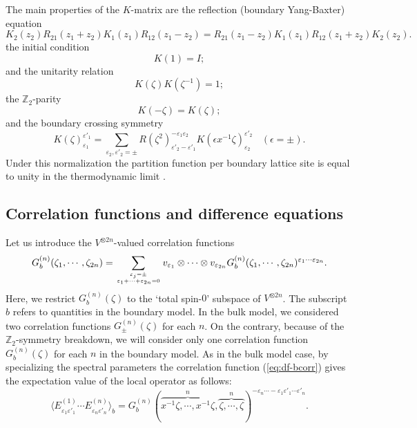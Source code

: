 \documentclass[a4paper,10pt]{article}
\begin{document}
{The main properties of the $K$-matrix 
are the reflection (boundary Yang-Baxter) equation
\begin{equation}
K_2 (z_2 )R_{21}(z_1 +z_2 )K_1 (z_1 )R_{12}(z_1 -z_2 )
=
R_{21}(z_1 -z_2 )K_1 (z_1 )R_{12}(z_1 +z_2 )K_2 (z_2 ). 
\label{eq:RE}
\end{equation}
the initial condition 
\begin{equation}
K(1)=I; 
\label{eq:b-ini}
\end{equation}
and the unitarity relation
\begin{equation}
K(\zeta)K(\zeta^{-1})=1; 
\label{eq:b-uni}
\end{equation}
the $\mathbb{Z}_2$-parity 
\begin{equation}
K(-\zeta)=K(\zeta); 
\label{eq:KZ_2}
\end{equation}
and the boundary crossing symmetry
\begin{equation}
K(\zeta)^{\varepsilon'_1}_{\varepsilon_1}
=\sum_{\varepsilon_2 , \varepsilon'_2 =\pm} 
    R(\zeta^2)_{\varepsilon'_2 -\varepsilon'_1}^{
    -\varepsilon_1 \varepsilon_2} 
    K(\epsilon x^{-1}\zeta )^{
    \varepsilon'_2}_{\varepsilon_2} 
    ~~~~ (\epsilon =\pm ). 
\label{eq:b-cross}
\end{equation}
Under this normalization the partition function per 
boundary lattice site is equal to unity in the 
thermodynamic limit \cite{JKKKM}. 

\subsection{Correlation functions and difference equations}

Let us introduce the $V^{\otimes 2n}$-valued 
correlation functions 
\begin{equation}
G^{(n)}_b (\zeta_1,\cdots,\zeta_{2n})=
\sum_{\varepsilon_j =\pm\atop \varepsilon_1 +
\cdots +\varepsilon_{2n}=0} v_{\varepsilon_1} \otimes 
\cdots \otimes v_{\varepsilon_{2n}} 
G^{(n)}_b (\zeta_1,\cdots,\zeta_{2n})
^{\varepsilon_1 \cdots \varepsilon_{2n}}. 
\label{eq:df-bcorr}
\end{equation}
Here, we restrict $G^{(n)}_b (\zeta)$ 
to the `total spin-$0$' subspace of $V^{\otimes 2n}$. 
The subscript $b$ refers to quantities in the boundary 
model. In the bulk model, we considered two correlation 
functions $G^{(n)}_\pm (\zeta)$ for each $n$. On the contrary, 
because of the  $\mathbb{Z}_2$-symmetry breakdown, 
we will consider only one correlation function 
$G^{(n)}_b (\zeta)$ for each $n$ in the boundary model. 
As in the bulk model case, by specializing 
the spectral parameters the correlation 
function (\ref{eq:df-bcorr}) gives the expectation 
value of the local operator as follows: 
\begin{equation}
\langle E^{(1)}_{\varepsilon_1 \varepsilon'_1} 
\cdots E^{(n)}_{\varepsilon_n \varepsilon'_n} 
\rangle_b 
=G^{(n)}_b (\overbrace{x^{-1}\zeta,\cdots,
x^{-1}\zeta}^{n}, \overbrace{\zeta,\cdots,\zeta}^{n})^{
-\varepsilon_{n}\cdots -\varepsilon_{1}\varepsilon'_1 
\cdots \varepsilon'_{n}}. 
\label{eq:b-spec}
\end{equation}

}
\end{document}
